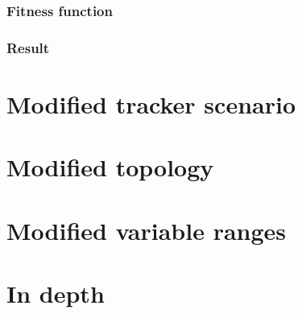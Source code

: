 \documentclass[10pt]{article}
\begin{document}
		\subsubsection{Fitness function}
		\subsubsection{Result}
\section{Modified tracker scenario}
\section{Modified topology}
\section{Modified variable ranges}
\section{In depth}
\end{document}
